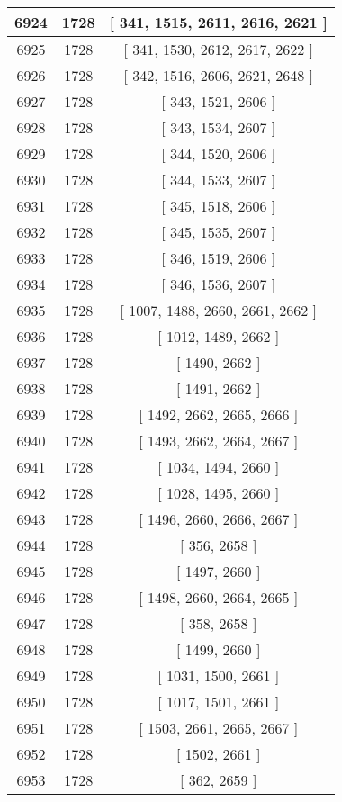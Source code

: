 \begin{center}
\begin{longtable}[H]{|| c c c ||}
\hline
6924 & 1728 & [ 341, 1515, 2611, 2616, 2621 ] \\ 
\hline
6925 & 1728 & [ 341, 1530, 2612, 2617, 2622 ] \\ 
\hline
6926 & 1728 & [ 342, 1516, 2606, 2621, 2648 ] \\ 
\hline
6927 & 1728 & [ 343, 1521, 2606 ] \\ 
\hline
6928 & 1728 & [ 343, 1534, 2607 ] \\ 
\hline
6929 & 1728 & [ 344, 1520, 2606 ] \\ 
\hline
6930 & 1728 & [ 344, 1533, 2607 ] \\ 
\hline
6931 & 1728 & [ 345, 1518, 2606 ] \\ 
\hline
6932 & 1728 & [ 345, 1535, 2607 ] \\ 
\hline
6933 & 1728 & [ 346, 1519, 2606 ] \\ 
\hline
6934 & 1728 & [ 346, 1536, 2607 ] \\ 
\hline
6935 & 1728 & [ 1007, 1488, 2660, 2661, 2662 ] \\ 
\hline
6936 & 1728 & [ 1012, 1489, 2662 ] \\ 
\hline
6937 & 1728 & [ 1490, 2662 ] \\ 
\hline
6938 & 1728 & [ 1491, 2662 ] \\ 
\hline
6939 & 1728 & [ 1492, 2662, 2665, 2666 ] \\ 
\hline
6940 & 1728 & [ 1493, 2662, 2664, 2667 ] \\ 
\hline
6941 & 1728 & [ 1034, 1494, 2660 ] \\ 
\hline
6942 & 1728 & [ 1028, 1495, 2660 ] \\ 
\hline
6943 & 1728 & [ 1496, 2660, 2666, 2667 ] \\ 
\hline
6944 & 1728 & [ 356, 2658 ] \\ 
\hline
6945 & 1728 & [ 1497, 2660 ] \\ 
\hline
6946 & 1728 & [ 1498, 2660, 2664, 2665 ] \\ 
\hline
6947 & 1728 & [ 358, 2658 ] \\ 
\hline
6948 & 1728 & [ 1499, 2660 ] \\ 
\hline
6949 & 1728 & [ 1031, 1500, 2661 ] \\ 
\hline
6950 & 1728 & [ 1017, 1501, 2661 ] \\ 
\hline
6951 & 1728 & [ 1503, 2661, 2665, 2667 ] \\ 
\hline
6952 & 1728 & [ 1502, 2661 ] \\ 
\hline
6953 & 1728 & [ 362, 2659 ] \\ 
\hline

\end{longtable}
\end{center}
